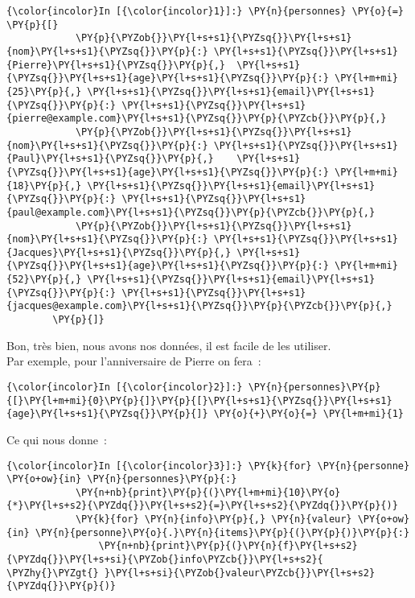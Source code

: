     \begin{Verbatim}[commandchars=\\\{\}]
{\color{incolor}In [{\color{incolor}1}]:} \PY{n}{personnes} \PY{o}{=} \PY{p}{[}
            \PY{p}{\PYZob{}}\PY{l+s+s1}{\PYZsq{}}\PY{l+s+s1}{nom}\PY{l+s+s1}{\PYZsq{}}\PY{p}{:} \PY{l+s+s1}{\PYZsq{}}\PY{l+s+s1}{Pierre}\PY{l+s+s1}{\PYZsq{}}\PY{p}{,}  \PY{l+s+s1}{\PYZsq{}}\PY{l+s+s1}{age}\PY{l+s+s1}{\PYZsq{}}\PY{p}{:} \PY{l+m+mi}{25}\PY{p}{,} \PY{l+s+s1}{\PYZsq{}}\PY{l+s+s1}{email}\PY{l+s+s1}{\PYZsq{}}\PY{p}{:} \PY{l+s+s1}{\PYZsq{}}\PY{l+s+s1}{pierre@example.com}\PY{l+s+s1}{\PYZsq{}}\PY{p}{\PYZcb{}}\PY{p}{,}
            \PY{p}{\PYZob{}}\PY{l+s+s1}{\PYZsq{}}\PY{l+s+s1}{nom}\PY{l+s+s1}{\PYZsq{}}\PY{p}{:} \PY{l+s+s1}{\PYZsq{}}\PY{l+s+s1}{Paul}\PY{l+s+s1}{\PYZsq{}}\PY{p}{,}    \PY{l+s+s1}{\PYZsq{}}\PY{l+s+s1}{age}\PY{l+s+s1}{\PYZsq{}}\PY{p}{:} \PY{l+m+mi}{18}\PY{p}{,} \PY{l+s+s1}{\PYZsq{}}\PY{l+s+s1}{email}\PY{l+s+s1}{\PYZsq{}}\PY{p}{:} \PY{l+s+s1}{\PYZsq{}}\PY{l+s+s1}{paul@example.com}\PY{l+s+s1}{\PYZsq{}}\PY{p}{\PYZcb{}}\PY{p}{,}
            \PY{p}{\PYZob{}}\PY{l+s+s1}{\PYZsq{}}\PY{l+s+s1}{nom}\PY{l+s+s1}{\PYZsq{}}\PY{p}{:} \PY{l+s+s1}{\PYZsq{}}\PY{l+s+s1}{Jacques}\PY{l+s+s1}{\PYZsq{}}\PY{p}{,} \PY{l+s+s1}{\PYZsq{}}\PY{l+s+s1}{age}\PY{l+s+s1}{\PYZsq{}}\PY{p}{:} \PY{l+m+mi}{52}\PY{p}{,} \PY{l+s+s1}{\PYZsq{}}\PY{l+s+s1}{email}\PY{l+s+s1}{\PYZsq{}}\PY{p}{:} \PY{l+s+s1}{\PYZsq{}}\PY{l+s+s1}{jacques@example.com}\PY{l+s+s1}{\PYZsq{}}\PY{p}{\PYZcb{}}\PY{p}{,}
        \PY{p}{]}
\end{Verbatim}


    Bon, très bien, nous avons nos données, il est facile de les utiliser.\\

Par exemple, pour l'anniversaire de Pierre on fera~:

    \begin{Verbatim}[commandchars=\\\{\}]
{\color{incolor}In [{\color{incolor}2}]:} \PY{n}{personnes}\PY{p}{[}\PY{l+m+mi}{0}\PY{p}{]}\PY{p}{[}\PY{l+s+s1}{\PYZsq{}}\PY{l+s+s1}{age}\PY{l+s+s1}{\PYZsq{}}\PY{p}{]} \PY{o}{+}\PY{o}{=} \PY{l+m+mi}{1}
\end{Verbatim}


    Ce qui nous donne~:

    \begin{Verbatim}[commandchars=\\\{\}]
{\color{incolor}In [{\color{incolor}3}]:} \PY{k}{for} \PY{n}{personne} \PY{o+ow}{in} \PY{n}{personnes}\PY{p}{:}
            \PY{n+nb}{print}\PY{p}{(}\PY{l+m+mi}{10}\PY{o}{*}\PY{l+s+s2}{\PYZdq{}}\PY{l+s+s2}{=}\PY{l+s+s2}{\PYZdq{}}\PY{p}{)}
            \PY{k}{for} \PY{n}{info}\PY{p}{,} \PY{n}{valeur} \PY{o+ow}{in} \PY{n}{personne}\PY{o}{.}\PY{n}{items}\PY{p}{(}\PY{p}{)}\PY{p}{:}
                \PY{n+nb}{print}\PY{p}{(}\PY{n}{f}\PY{l+s+s2}{\PYZdq{}}\PY{l+s+si}{\PYZob{}info\PYZcb{}}\PY{l+s+s2}{ \PYZhy{}\PYZgt{} }\PY{l+s+si}{\PYZob{}valeur\PYZcb{}}\PY{l+s+s2}{\PYZdq{}}\PY{p}{)}
\end{Verbatim}



